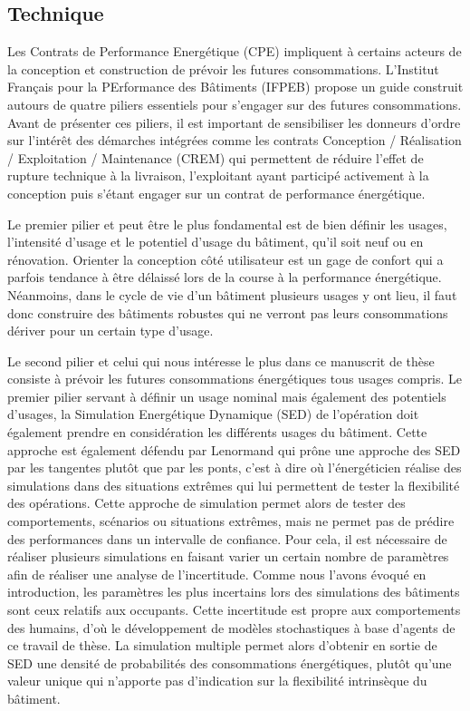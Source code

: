 \subsection{Technique}
\label{Engagement performantiel - Technique}

Les Contrats de Performance Energétique (CPE) impliquent à certains acteurs de la conception et construction de prévoir les futures consommations. L'Institut Français pour la PErformance des Bâtiments (IFPEB) \cite{IFPEB-2014} propose un guide construit autours de quatre piliers essentiels pour s'engager sur des futures consommations. Avant de présenter ces piliers, il est important de sensibiliser les donneurs d'ordre sur l'intérêt des démarches intégrées comme les contrats Conception / Réalisation / Exploitation / Maintenance (CREM) qui permettent de réduire l'effet de rupture technique à la livraison, l'exploitant ayant participé activement à la conception puis s'étant engager sur un contrat de performance énergétique.

Le premier pilier et peut être le plus fondamental est de bien définir les usages, l'intensité d'usage et le potentiel d'usage du bâtiment, qu'il soit neuf ou en rénovation. Orienter la conception côté utilisateur est un gage de confort qui a parfois tendance à être délaissé lors de la course à la performance énergétique. Néanmoins, dans le cycle de vie d'un bâtiment plusieurs usages y ont lieu, il faut donc construire des bâtiments robustes qui ne verront pas leurs consommations dériver pour un certain type d'usage.

Le second pilier et celui qui nous intéresse le plus dans ce manuscrit de thèse consiste à prévoir les futures consommations énergétiques tous usages compris. Le premier pilier servant à définir un usage nominal mais également des potentiels d'usages, la Simulation Energétique Dynamique (SED) de l'opération doit également prendre en considération les différents usages du bâtiment. Cette approche est également défendu par Lenormand \cite{Lenormand-15} qui prône une approche des SED par les tangentes plutôt que par les ponts, c'est à dire où l'énergéticien réalise des simulations dans des situations extrêmes qui lui permettent de tester la flexibilité des opérations. Cette approche de simulation permet alors de tester des comportements, scénarios ou situations extrêmes, mais ne permet pas de prédire des performances dans un intervalle de confiance. Pour cela, il est nécessaire de réaliser plusieurs simulations en faisant varier un certain nombre de paramètres afin de réaliser une analyse de l'incertitude. Comme nous l'avons évoqué en introduction, les paramètres les plus incertains lors des simulations des bâtiments sont ceux relatifs aux occupants. Cette incertitude est propre aux comportements des humains, d'où le développement de modèles stochastiques à base d'agents de ce travail de thèse. La simulation multiple permet alors d'obtenir en sortie de SED une densité de probabilités des consommations énergétiques, plutôt qu'une valeur unique qui n'apporte pas d'indication sur la flexibilité intrinsèque du bâtiment.

